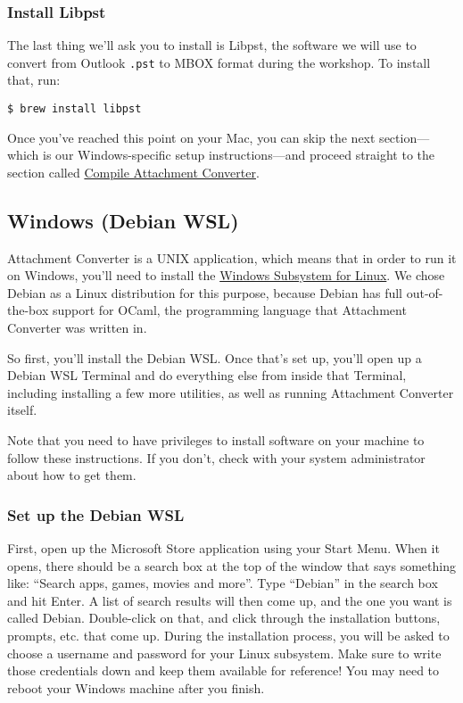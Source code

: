 \documentclass[11pt]{article}
\begin{document}
\subsubsection*{Install Libpst}
\label{sec:org3875fa5}

The last thing we'll ask you to install is Libpst, the software we
will use to convert from Outlook \texttt{.pst} to MBOX format during the
workshop.  To install that, run:

\begin{verbatim}
$ brew install libpst
\end{verbatim}

Once you've reached this point on your Mac, you can skip the next
section---which is our Windows-specific setup instructions---and
proceed straight to the section called \hyperref[orgb563d22]{Compile Attachment Converter}.

\subsection*{Windows (Debian WSL) \label{orgad22b61}}
\label{sec:orgadd7de7}

Attachment Converter is a UNIX application, which means that in order
to run it on Windows, you'll need to install the \href{https://en.wikipedia.org/wiki/Windows\_Subsystem\_for\_Linux}{Windows Subsystem for
Linux}.  We chose Debian as a Linux distribution for this purpose,
because Debian has full out-of-the-box support for OCaml, the
programming language that Attachment Converter was written in.

So first, you'll install the Debian WSL.  Once that's set up, you'll
open up a Debian WSL Terminal and do everything else from inside that
Terminal, including installing a few more utilities, as well as
running Attachment Converter itself.

Note that you need to have privileges to install software on your
machine to follow these instructions.  If you don't, check with your
system administrator about how to get them.

\subsubsection*{Set up the Debian WSL}
\label{sec:org6e08db3}

First, open up the Microsoft Store application using your Start Menu.
When it opens, there should be a search box at the top of the window
that says something like: ``Search apps, games, movies and more''.  Type
``Debian'' in the search box and hit Enter.  A list of search results
will then come up, and the one you want is called Debian.
Double-click on that, and click through the installation buttons,
prompts, etc. that come up.  During the installation process, you will
be asked to choose a username and password for your Linux subsystem.
Make sure to write those credentials down and keep them available for
reference! You may need to reboot your Windows machine after you
finish.
\end{document}
